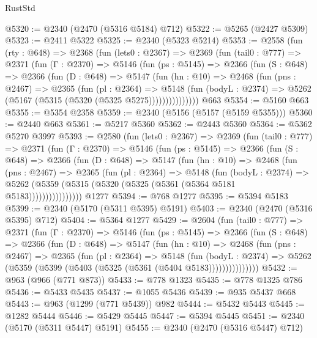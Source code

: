 \begin{lexlean}{RustStd}
\begin{coremodule}
@5320 := @2340 (@2470 (@5316 @5184) @712)
@5322 := @5265 (@2427 @5309)
@5323 := @2411 @5322
@5325 := @2340 (@5323 @5214)
@5353 := @2558
    (fun (rty : @648) =>
    @2368
      (fun (lets0 : @2367) =>
      @2369
        (fun (tail0 : @777) =>
        @2371
          (fun (Γ : @2370) =>
          @5146
            (fun (ps : @5145) =>
            @2366
              (fun (S : @648) =>
              @2366
                (fun (D : @648) =>
                @5147
                  (fun (hn : @10) =>
                  @2468
                    (fun (pns : @2467) =>
                    @2365
                      (fun (pl : @2364) =>
                      @5148
                        (fun (bodyL : @2374) =>
                        @5262 (@5167 (@5315 (@5320 (@5325 @5275)))))))))))))))
    @663
@5354 := @5160 @663
@5355 := @5354 @2358
@5359 := @2340 (@5156 (@5157 (@5159 @5355)))
@5360 := @2440 @663
@5361 := @5217 @5360
@5362 := @2443 @5360
@5364 := @5362 @5270 @3997
@5393 := @2580
    (fun (lets0 : @2367) =>
    @2369
      (fun (tail0 : @777) =>
      @2371
        (fun (Γ : @2370) =>
        @5146
          (fun (ps : @5145) =>
          @2366
            (fun (S : @648) =>
            @2366
              (fun (D : @648) =>
              @5147
                (fun (hn : @10) =>
                @2468
                  (fun (pns : @2467) =>
                  @2365
                    (fun (pl : @2364) =>
                    @5148
                      (fun (bodyL : @2374) =>
                      @5262 (@5359 (@5315 (@5320 (@5325 (@5361 (@5364 @5181 @5183))))))))))))))))
    @1277
@5394 := @768 @1277
@5395 := @5394 @5183
@5399 := @2340 (@5170 (@5311 @5395) @5191)
@5403 := @2340 (@2470 (@5316 @5395) @712)
@5404 := @5364 @1277
@5429 := @2604
    (fun (tail0 : @777) =>
    @2371
      (fun (Γ : @2370) =>
      @5146
        (fun (ps : @5145) =>
        @2366
          (fun (S : @648) =>
          @2366
            (fun (D : @648) =>
            @5147
              (fun (hn : @10) =>
              @2468
                (fun (pns : @2467) =>
                @2365
                  (fun (pl : @2364) =>
                  @5148
                    (fun (bodyL : @2374) =>
                    @5262 (@5359 (@5399 (@5403 (@5325 (@5361 (@5404 @5183)))))))))))))))
@5432 := @963 (@966 (@771 @873))
@5433 := @778 @1323
@5435 := @778 @1325 @786
@5436 := @5433 @5435
@5437 := @1055 @5436
@5439 := @935 @5437 @668
@5443 := @963 (@1299 (@771 @5439)) @982
@5444 := @5432 @5443
@5445 := @1282 @5444
@5446 := @5429 @5445
@5447 := @5394 @5445
@5451 := @2340 (@5170 (@5311 @5447) @5191)
@5455 := @2340 (@2470 (@5316 @5447) @712)

\end{coremodule}
\end{lexlean}
